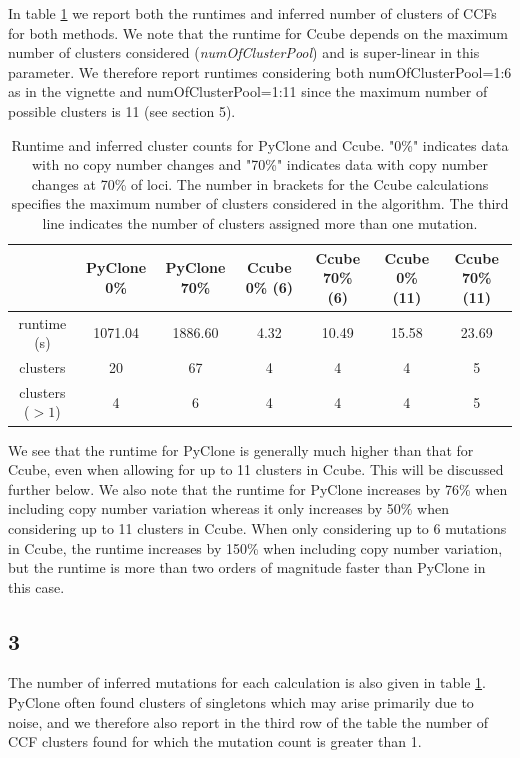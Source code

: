\documentclass{article}
\begin{document}
In table \ref{tab:perf} we report both the runtimes and inferred number of clusters of CCFs for both methods.
We note that the runtime for Ccube depends on the maximum number of clusters considered (\textit{numOfClusterPool}) and is super-linear in this parameter. We therefore report runtimes considering both numOfClusterPool=1:6 as in the vignette and numOfClusterPool=1:11 since the maximum number of possible clusters is 11 (see section 5).
 

\begin{table}[h]
\centering
\begin{tabular}{ |c|c|c|c|c|c|c|}
\hline
 & PyClone 0\% & PyClone 70\% & Ccube 0\% (6) & Ccube 70\% (6)& Ccube 0\% (11) & Ccube 70\% (11) \\
\hline
runtime (s) &  1071.04  & 1886.60 & 4.32 & 10.49 & 15.58 &  23.69\\
clusters & 20 & 67 & 4 & 4 & 4 & 5\\
clusters ($>1$) & 4 & 6 & 4 & 4 & 4 & 5\\
\hline
\end{tabular}
\caption{Runtime and inferred cluster counts for PyClone and Ccube. "0\%" indicates data with no copy number changes and "70\%" indicates data with copy number changes at 70\% of loci. The number in brackets for the Ccube calculations specifies the maximum number of clusters considered in the algorithm. The third line indicates the number of clusters assigned more than one mutation.}
\label{tab:perf}
\end{table}

We see that the runtime for PyClone is generally much higher than that for Ccube, even when allowing for up to 11 clusters in Ccube. This will be discussed further below. We also note that the runtime for PyClone increases by 76\% when including copy number variation whereas it only increases by 50\% when considering up to 11 clusters in Ccube. When only considering up to 6 mutations in Ccube, the runtime increases by 150\% when including copy number variation, but the runtime is more than two orders of magnitude faster than PyClone in this case.

\subsection*{3}

The number of inferred mutations for each calculation is also given in table \ref{tab:perf}. PyClone often found clusters of singletons which may arise primarily due to noise, and we therefore also report in the third row of the table the number of CCF clusters found for which the mutation count is greater than 1.
\end{document}

